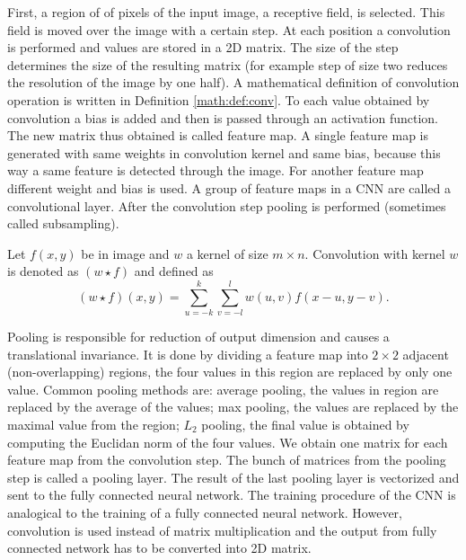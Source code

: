 First, a region of of pixels of the input image, a receptive field,  is selected. This field is moved over the image with a certain step. At each position a convolution is performed and values are stored in a 2D matrix. The size of the step determines the size of the resulting matrix (for example step of size two reduces the resolution of the image by one half). A mathematical definition of convolution operation is written in Definition \ref*{math:def:conv}. To each value obtained by convolution a bias is added and then is passed through an activation function. The new matrix thus obtained is called feature map. A single feature map is generated with same weights in convolution kernel and same bias, because this way a same feature is detected through the image. For another feature map different weight and bias is used. A group of feature maps in a CNN are called a convolutional layer. After the convolution step pooling is performed (sometimes called subsampling).\cite{DIP}

\begin{definition}
    Let $f(x,y)$ be in image and $w$ a kernel of size $m \times n$. Convolution with kernel $w$ is denoted as 
    $(w\star f)$     and defined as
    \begin{equation}
        (w\star f)(x,y) = \sum_{u=-k} ^{k} \sum_{v=-l} ^{l} w(u,v) f(x-u, y-v).
    \end{equation}
    \label{math:def:conv}
\end{definition}

Pooling is responsible for reduction of output dimension and causes a translational invariance. It is done by dividing a feature map into $2 \times 2 $ adjacent (non-overlapping) regions, the four values in this region are replaced by only one value. Common pooling methods are: average pooling, the values in region are replaced by the average of the values; max pooling, the values are replaced by the maximal value from the region; $L_2$ pooling, the final value is obtained by computing the Euclidan norm of the four values. We obtain one matrix for each feature map from the convolution step. The bunch of matrices from the pooling step is called a pooling layer. The result of the last pooling layer is vectorized and sent to the fully connected neural network. The training procedure of the CNN is analogical to the training of a fully connected neural network. However, convolution is used instead of matrix multiplication and the output from fully connected network has to be converted into 2D matrix.\cite{DIP}

